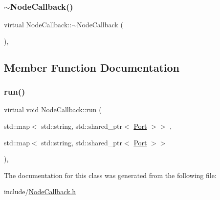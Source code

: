\mbox{\label{class_node_callback_ac9474867612b9fa6327dfe5cc5d29bec}} 
\subsubsection{\texorpdfstring{$\sim$\+Node\+Callback()}{~NodeCallback()}}
{\footnotesize\ttfamily virtual Node\+Callback\+::$\sim$\+Node\+Callback (\begin{DoxyParamCaption}{ }\end{DoxyParamCaption})\hspace{0.3cm}{\ttfamily [inline]}, {\ttfamily [virtual]}}



\subsection{Member Function Documentation}
\mbox{\label{class_node_callback_a94eb8c2fd7162ffcc4abff8bd2e852b3}} 
\subsubsection{\texorpdfstring{run()}{run()}}
{\footnotesize\ttfamily virtual void Node\+Callback\+::run (\begin{DoxyParamCaption}\item[{std\+::map$<$ std\+::string, std\+::shared\+\_\+ptr$<$ \hyperlink{class_port}{Port} $>$$>$}]{,  }\item[{std\+::map$<$ std\+::string, std\+::shared\+\_\+ptr$<$ \hyperlink{class_port}{Port} $>$$>$}]{ }\end{DoxyParamCaption})\hspace{0.3cm}{\ttfamily [inline]}, {\ttfamily [virtual]}}



The documentation for this class was generated from the following file\+:\begin{DoxyCompactItemize}
\item 
include/\hyperlink{_node_callback_8h}{Node\+Callback.\+h}\end{DoxyCompactItemize}
